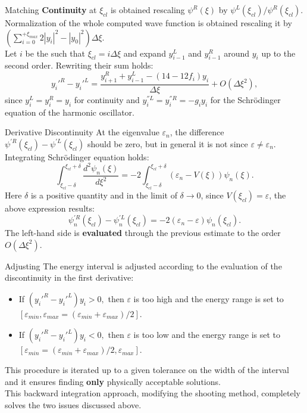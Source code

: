 \documentclass{beamer}
\begin{document}
\begin{frame}{Matching}
\textbf{Continuity} at $\xi_{cl}$ is obtained rescaling $\psi^R(\xi)$ by $\psi^L(\xi_{cl})/\psi^R(\xi_{cl})$.\\
\vspace{\baselineskip}
Normalization of the whole computed wave function is obtained rescaling it by $(\sum_{i=0}^{+\xi_{max}}2|y_i|^2-|y_0|^2)\Delta \xi$.
\vspace{\baselineskip}
\\Let $i$ be the such that $\xi_{cl}=i\Delta \xi$ and expand $y_{i-1}^L$ and $y_{i-1}^R$ around $y_i$ up to the second order. Rewriting their sum holds:
$$y_i'^R-y_i'^L=\frac{y_{i+1}^R+y_{i-1}^L-(14-12f_i)y_i}{\Delta \xi}+O(\Delta \xi^2),$$
since $y_{i}^L=y_{i}^R=y_i$ for continuity and $y_{i}^{''L}=y_{i}^{''R}=-g_iy_i$ for the Schr\"{o}dinger equation of the harmonic oscillator.
\end{frame}

\begin{frame}{Derivative Discontinuity}
At the eigenvalue $\varepsilon_n$, the difference $\psi^{'R}(\xi_{cl})-\psi^{'L}(\xi_{cl})$ should be zero, but in general it is not since $\varepsilon\neq \varepsilon_n$. Integrating Schr\"{o}dinger equation holds:
$$\int_{\xi_{cl}-\delta}^{\xi_{cl}+\delta}\frac{d^2\psi_n(\xi)}{d\xi^2}=-2\int_{\xi_{cl}-\delta}^{\xi_{cl}+\delta}(\varepsilon_n-V(\xi))\psi_n(\xi).$$
Here $\delta$ is a positive quantity and in the limit of $\delta\to0$, since $V(\xi_{cl})=\varepsilon$, the above expression results:
$$\psi_n^{'R}(\xi_{cl})-\psi_n^{'L}(\xi_{cl})=-2(\varepsilon_n-\varepsilon)\psi_n(\xi_{cl}).$$
The left-hand side is \textbf{evaluated} through the previous estimate to the order $O(\Delta \xi^2)$.
\end{frame}

\begin{frame}{Adjusting}
The energy interval is adjusted according to the evaluation of the discontinuity in the first derivative:
\vspace{0.5em}
\begin{itemize}
\item If $(y_i'^R-y_i'^L)y_i>0,$ then $\varepsilon$ is too high and the energy range is set to $[\varepsilon_{min},\varepsilon_{max}=(\varepsilon_{min}+\varepsilon_{max})/2]$.
\vspace{0.5em}
\item If $(y_i'^R-y_i'^L)y_i<0,$ then $\varepsilon$ is too low and the energy range is set to $[\varepsilon_{min}=(\varepsilon_{min}+\varepsilon_{max})/2,\varepsilon_{max}]$.
\end{itemize}
\vspace{0.5em}
This procedure is iterated up to a given tolerance on the width of the interval and it ensures finding \textbf{only} physically acceptable solutions.
\vspace{0.5em}
\\This backward integration approach, modifying the shooting method, completely solves the two issues discussed above.
\end{frame}
\end{document}

